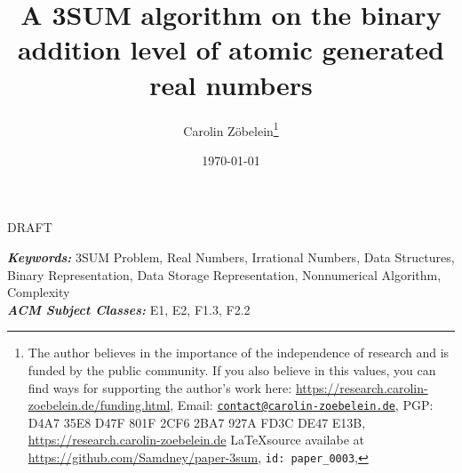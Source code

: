 \documentclass{article}
\newtheorem*{theorem A}{Theorem A}
\newtheorem*{theorem B}{N\"olker's Theorem}
\theoremstyle{remark}
\theoremstyle{remark}
\begin{document}
\title{A 3SUM algorithm on the binary addition level of atomic generated real numbers}
\author{Carolin Z\"obelein\thanks{The author believes in the importance of the independence of research and is funded by the public community. If you also believe in this values, you can find ways for supporting the author's work here: \url{https://research.carolin-zoebelein.de/funding.html}, Email: \href{mailto:contact@carolin-zoebelein.de}{\texttt{contact@carolin-zoebelein.de}}, PGP: D4A7 35E8 D47F 801F 2CF6 2BA7 927A FD3C DE47 E13B, \url{https://research.carolin-zoebelein.de} \LaTeX source availabe at \url{https://github.com/Samdney/paper-3sum}, \texttt{id: paper\_0003}, \Cooley}}
\date{\today}
\maketitle
\begin{center}
    DRAFT
\end{center}
\begin{abstract}
    \blindtext[1]
\end{abstract}
\providecommand{\keywords}[1]{\small{\textbf{\textit{Keywords:}} #1}}
\providecommand{\Classification}[1]{\small{\textbf{\textit{ACM Subject Classes:}} #1}}

\begin{flushleft}
    \keywords{3SUM Problem, Real Numbers, Irrational Numbers, Data Structures, Binary Representation, Data Storage Representation, Nonnumerical Algorithm, Complexity}\\
    \Classification{E1, E2, F1.3, F2.2}
\end{flushleft}
\tableofcontents
\end{document}
